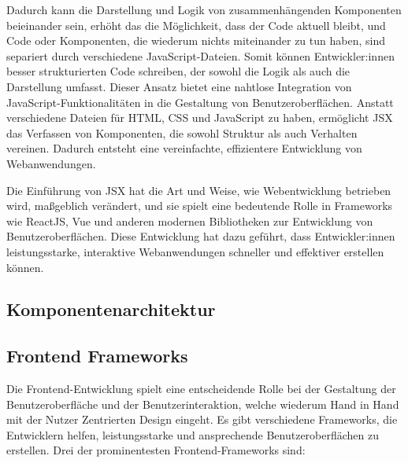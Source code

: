 Dadurch kann die Darstellung und Logik von zusammenhängenden Komponenten beieinander sein, erhöht das die Möglichkeit, dass der Code aktuell bleibt, und Code oder Komponenten, die wiederum nichts miteinander zu tun haben, sind separiert durch verschiedene JavaScript-Dateien. Somit können Entwickler:innen besser strukturierten Code schreiben, der sowohl die Logik als auch die Darstellung umfasst. Dieser Ansatz bietet eine nahtlose Integration von JavaScript-Funktionalitäten in die Gestaltung von Benutzeroberflächen. Anstatt verschiedene Dateien für \acs{HTML}, \acs{CSS} und JavaScript zu haben, ermöglicht \acs{JSX} das Verfassen von Komponenten, die sowohl Struktur als auch Verhalten vereinen. Dadurch entsteht eine vereinfachte, effizientere Entwicklung von Webanwendungen.

Die Einführung von \acs{JSX} hat die Art und Weise, wie Webentwicklung betrieben wird, maßgeblich verändert, und sie spielt eine bedeutende Rolle in Frameworks wie ReactJS, Vue und anderen modernen Bibliotheken zur Entwicklung von Benutzeroberflächen. Diese Entwicklung hat dazu geführt, dass Entwickler:innen leistungsstarke, interaktive Webanwendungen schneller und effektiver erstellen können.\cite{react-jsx-explained}

\subsection{Komponentenarchitektur}


\subsection{Frontend Frameworks}

Die Frontend-Entwicklung spielt eine entscheidende Rolle bei der Gestaltung der Benutzeroberfläche und der Benutzerinteraktion, welche wiederum Hand in Hand mit der Nutzer Zentrierten Design eingeht. Es gibt verschiedene Frameworks, die Entwicklern helfen, leistungsstarke und ansprechende Benutzeroberflächen zu erstellen. Drei der prominentesten Frontend-Frameworks sind:


